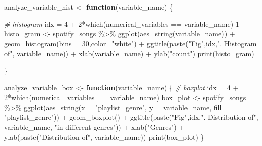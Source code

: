 \documentclass[
]{article}
\newenvironment{Shaded}{\begin{snugshade}}{\end{snugshade}}
\newcommand{\AttributeTok}[1]{\textcolor[rgb]{0.77,0.63,0.00}{#1}}
\newcommand{\CommentTok}[1]{\textcolor[rgb]{0.56,0.35,0.01}{\textit{#1}}}
\newcommand{\ControlFlowTok}[1]{\textcolor[rgb]{0.13,0.29,0.53}{\textbf{#1}}}
\newcommand{\DecValTok}[1]{\textcolor[rgb]{0.00,0.00,0.81}{#1}}
\newcommand{\FunctionTok}[1]{\textcolor[rgb]{0.00,0.00,0.00}{#1}}
\newcommand{\NormalTok}[1]{#1}
\newcommand{\OtherTok}[1]{\textcolor[rgb]{0.56,0.35,0.01}{#1}}
\newcommand{\SpecialCharTok}[1]{\textcolor[rgb]{0.00,0.00,0.00}{#1}}
\newcommand{\StringTok}[1]{\textcolor[rgb]{0.31,0.60,0.02}{#1}}
\begin{document}
\begin{Shaded}
\begin{Highlighting}[]
\NormalTok{analyze\_variable\_hist }\OtherTok{\textless{}{-}} \ControlFlowTok{function}\NormalTok{(variable\_name) \{}
  
  \CommentTok{\# histogram}
\NormalTok{  idx }\OtherTok{=} \DecValTok{4} \SpecialCharTok{+} \DecValTok{2}\SpecialCharTok{*}\FunctionTok{which}\NormalTok{(numerical\_variables }\SpecialCharTok{==}\NormalTok{ variable\_name)}\SpecialCharTok{{-}}\DecValTok{1}
\NormalTok{  histo\_gram }\OtherTok{\textless{}{-}}\NormalTok{ spotify\_songs }\SpecialCharTok{\%\textgreater{}\%} \FunctionTok{ggplot}\NormalTok{(}\FunctionTok{aes\_string}\NormalTok{(variable\_name)) }\SpecialCharTok{+} 
    \FunctionTok{geom\_histogram}\NormalTok{(}\AttributeTok{bins =} \DecValTok{30}\NormalTok{,}\AttributeTok{color=}\StringTok{"white"}\NormalTok{) }\SpecialCharTok{+}
    \FunctionTok{ggtitle}\NormalTok{(}\FunctionTok{paste}\NormalTok{(}\StringTok{"Fig"}\NormalTok{,idx,}\StringTok{". Histogram of"}\NormalTok{, variable\_name)) }\SpecialCharTok{+} 
    \FunctionTok{xlab}\NormalTok{(variable\_name) }\SpecialCharTok{+} \FunctionTok{ylab}\NormalTok{(}\StringTok{"count"}\NormalTok{)}
  \FunctionTok{print}\NormalTok{(histo\_gram)}
  
\NormalTok{\}}

\NormalTok{analyze\_variable\_box }\OtherTok{\textless{}{-}} \ControlFlowTok{function}\NormalTok{(variable\_name) \{}
\CommentTok{\# boxplot}
\NormalTok{  idx }\OtherTok{=} \DecValTok{4} \SpecialCharTok{+} \DecValTok{2}\SpecialCharTok{*}\FunctionTok{which}\NormalTok{(numerical\_variables }\SpecialCharTok{==}\NormalTok{ variable\_name)}
\NormalTok{  box\_plot }\OtherTok{\textless{}{-}}\NormalTok{ spotify\_songs }\SpecialCharTok{\%\textgreater{}\%} \FunctionTok{ggplot}\NormalTok{(}\FunctionTok{aes\_string}\NormalTok{(}\AttributeTok{x =} \StringTok{"playlist\_genre"}\NormalTok{, }
                                                  \AttributeTok{y =}\NormalTok{ variable\_name,}
                                                  \AttributeTok{fill =} \StringTok{"playlist\_genre"}\NormalTok{)) }\SpecialCharTok{+}
    \FunctionTok{geom\_boxplot}\NormalTok{() }\SpecialCharTok{+} \FunctionTok{ggtitle}\NormalTok{(}\FunctionTok{paste}\NormalTok{(}\StringTok{"Fig"}\NormalTok{,idx,}\StringTok{". Distribution of"}\NormalTok{, variable\_name, }\StringTok{"in different genres"}\NormalTok{)) }\SpecialCharTok{+} 
    \FunctionTok{xlab}\NormalTok{(}\StringTok{"Genres"}\NormalTok{) }\SpecialCharTok{+} \FunctionTok{ylab}\NormalTok{(}\FunctionTok{paste}\NormalTok{(}\StringTok{"Distribution of"}\NormalTok{, variable\_name))}
  \FunctionTok{print}\NormalTok{(box\_plot)}
\NormalTok{\}}


\end{Highlighting}
\end{Shaded}
\end{document}
